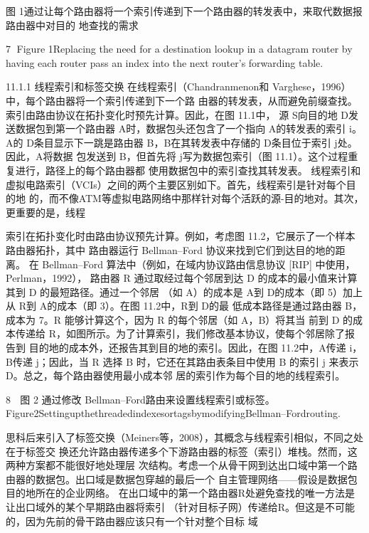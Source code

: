 图 1通过让每个路由器将一个索引传递到下一个路由器的转发表中，来取代数据报路由器中对目的
地查找的需求

                                                  7
Figure 1Replacing the need for a destination lookup in a datagram router by having each
router pass an index into the next router’s forwarding table.

11.1.1 线程索引和标签交换
在线程索引（Chandranmenon和 Varghese，1996）中，每个路由器将一个索引传递到下一个路
由器的转发表，从而避免前缀查找。索引由路由协议在拓扑变化时预先计算。因此，在图 11.1中，
源 S向目的地 D发送数据包到第一个路由器 A时，数据包头还包含了一个指向 A的转发表的索引
i。A的 D条目显示下一跳是路由器 B，B在其转发表中存储的 D条目位于索引 j处。因此，A将数据
包发送到 B，但首先将 j写为数据包索引（图 11.1）。这个过程重复进行，路径上的每个路由器都
使用数据包中的索引查找其转发表。
线程索引和虚拟电路索引（VCIs）之间的两个主要区别如下。首先，线程索引是针对每个目的地
的，而不像ATM等虚拟电路网络中那样针对每个活跃的源-目的地对。其次，更重要的是，线程



索引在拓扑变化时由路由协议预先计算。例如，考虑图 11.2，它展示了一个样本路由器拓扑，其中
路由器运行 Bellman–Ford 协议来找到它们到达目的地的距离。
在 Bellman–Ford 算法中（例如，在域内协议路由信息协议 [RIP] 中使用，Perlman，1992），
路由器 R 通过取经过每个邻居到达 D 的成本的最小值来计算其到 D 的最短路径。通过一个邻居
（如 A）的成本是 A到 D的成本（即 5）加上从 R到 A的成本（即 3）。在图 11.2中，R到 D的最
低成本路径是通过路由器 B，成本为 7。R 能够计算这个，因为 R 的每个邻居（如 A，B）将其当
前到 D 的成本传递给 R，如图所示。为了计算索引，我们修改基本协议，使每个邻居除了报告到
目的地的成本外，还报告其到目的地的索引。因此，在图 11.2中，A传递 i，B传递 j；因此，当 R
选择 B 时，它还在其路由表条目中使用 B 的索引 j 来表示 D。总之，每个路由器使用最小成本邻
居的索引作为每个目的地的线程索引。




                                                                                      8
             图 2 通过修改 Bellman–Ford路由来设置线程索引或标签。
    Figure2SettingupthethreadedindexesortagsbymodifyingBellman–Fordrouting.


思科后来引入了标签交换（Meiners等，2008），其概念与线程索引相似，不同之处在于标签交
换还允许路由器传递多个下游路由器的标签（索引）堆栈。然而，这两种方案都不能很好地处理层
次结构。考虑一个从骨干网到达出口域中第一个路由器的数据包。出口域是数据包穿越的最后一个
自主管理网络——假设是数据包目的地所在的企业网络。
   在出口域中的第一个路由器R处避免查找的唯一方法是让出口域外的某个早期路由器将索引
（针对目标子网）传递给R。但这是不可能的，因为先前的骨干路由器应该只有一个针对整个目标
                                              域



